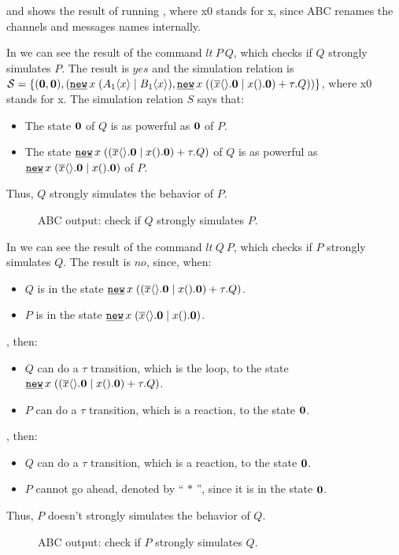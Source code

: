  and  shows the result of running , where x0 stands for x, since ABC renames the channels and messages names internally.

In  we can see the result of the command $lt\ P\ Q$, which checks if $Q$ strongly simulates $P$. The result is $yes$ and the simulation relation is $\mathcal{S} = \set{(\proczero,\proczero),(\procres{x}{(\procpar{\proccall{A_1}{x}}{\proccall{B_1}{x}})},\procres{x}{(\procchoice{(\procpar{\out{x}{}.\proczero}{\inp{x}{}.\proczero})}{\tau.Q})})}$, where x0 stands for x. The simulation relation $S$ says that: 
\begin{itemize}
\item The state $\mathbf{0}$ of $Q$ is as powerful as  $\mathbf{0}$ of $P$.
\item The state $\procres{x}{(\procchoice{(\procpar{\out{x}{}.\proczero}{\inp{x}{}.\proczero})}{\tau.Q})}$ of $Q$ is as powerful as  $\procres{x}{(\procpar{\out{x}{}.\proczero}{\inp{x}{}.\proczero})}$ of $P$.
\end{itemize}
Thus, $Q$ strongly simulates the behavior of $P$.
\begin{figure}[H]

\caption{ABC output: check if $Q$ strongly simulates $P$.}
\label{pi_simulation_ABC_outputPsQ}
\end{figure}

In  we can see the result of the command $lt\ Q\ P$, which checks if $P$ strongly simulates $Q$. The result is $no$, since, when:
\begin{itemize}
\item $Q$ is in the state $\procres{x}{(\procchoice{(\procpar{\out{x}{}.\proczero}{\inp{x}{}.\proczero})}{\tau.Q})}$.
\item $P$ is in the state $\procres{x}{(\procpar{\out{x}{}.\proczero}{\inp{x}{}.\proczero})}$.
\end{itemize}
, then:
\begin{itemize}
\item $Q$ can do a $\tau$ transition, which is the loop, to the state $\procres{x}{(\procchoice{(\procpar{\out{x}{}.\proczero}{\inp{x}{}.\proczero})}{\tau.Q})}$.
\item $P$ can do a $\tau$ transition, which is a reaction, to the state $\mathbf{0}$.
\end{itemize}
, then:
\begin{itemize}
\item $Q$ can do a $\tau$ transition, which is a reaction, to the state $\mathbf{0}$.
\item $P$ cannot go ahead, denoted by `` $*$ '', since it is in the state $\mathbf{0}$.
\end{itemize}

Thus, $P$ doesn't strongly simulates the behavior of $Q$.
\begin{figure}[ht!]

\caption{ABC output: check if $P$ strongly simulates $Q$.}
\label{pi_simulation_ABC_outputQsP}
\end{figure}
